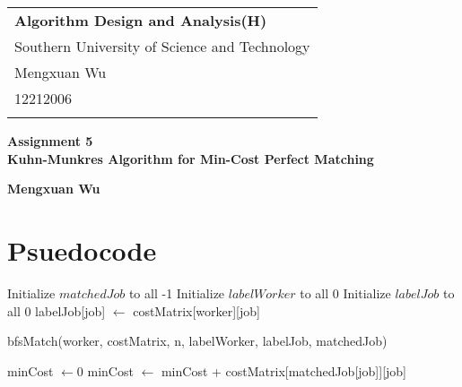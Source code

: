 \documentclass[a4paper,12pt]{article}
\begin{document}
\thispagestyle{empty} %

\begin{tabular}{p{15.5cm}}
{\large \bf Algorithm Design and Analysis(H)} \\
Southern University of Science and Technology \\ Mengxuan Wu \\ 12212006 \\
\hline
\\
\end{tabular}

\begin{center}
	{\Large \bf Assignment 5 \\ Kuhn-Munkres Algorithm for Min-Cost Perfect Matching}
	\vspace{2mm}

	{\bf Mengxuan Wu}
		
\end{center}  

\section{Psuedocode}

\begin{algorithm}[H]
	\caption{Kuhn-Munkres}
		Initialize $matchedJob$ to all -1\;
		Initialize $labelWorker$ to all 0\;
		Initialize $labelJob$ to all 0\;
		\BlankLine
		 {
			 {
				 {
					labelJob[job] $\gets$ costMatrix[worker][job]\;
				}
			}
		}
	
		 {
			bfsMatch(worker, costMatrix, n, labelWorker, labelJob, matchedJob)\;
		}
		
		minCost $\gets 0$\;
		 {
			 {
				minCost $\gets$ minCost + costMatrix[matchedJob[job]][job]\;
			}
		}
		
		\;
\end{algorithm}
\end{document}
